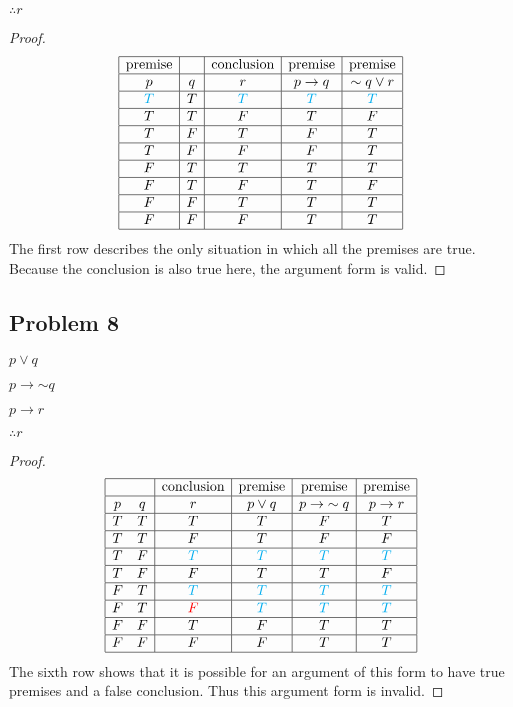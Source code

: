 \documentclass[14pt]{extarticle}
\begin{document}
$\therefore r$

\begin{proof}
$$
\begin{array}{|c|c|c|c|c|}
\hline
\text{premise} & & \text{conclusion} & \text{premise} & \text{premise} \\
\hline
p & q & r & p \to q & {\sim q} \vee r \\
\hline
\color{cyan} T & T & \color{cyan} T & \color{cyan} T & \color{cyan} T \\
\hline
T & T & F & T & F \\
\hline
T & F & T & F & T \\
\hline
T & F & F & F & T \\
\hline
F & T & T & T & T \\
\hline
F & T & F & T & F \\
\hline
F & F & T & T & T \\
\hline
F & F & F & T & T \\
\hline
\end{array}
$$
The first row describes the only situation in which all the premises are true.
Because the conclusion is also true here, the argument form is valid.
\end{proof}

\subsection{Problem 8}
$p \vee q$

$p \to {\sim q}$

$p \to r$

$\therefore r$

\begin{proof}
$$
\begin{array}{|cc|c|c|c|c|}
\hline
 & & \text{conclusion} & \text{premise} & \text{premise} & \text{premise} \\
\hline
p & q & r & p \vee q & p \to {\sim q} & p \to r \\
\hline
T & T & T & T & F & T \\
\hline
T & T & F & T & F & F \\
\hline
T & F & \color{cyan} T & \color{cyan} T & \color{cyan} T & \color{cyan} T \\
\hline
T & F & F & T & T & F \\
\hline
F & T & \color{cyan} T & \color{cyan} T & \color{cyan} T & \color{cyan} T \\
\hline
F & T & \color{red} F & \color{cyan} T & \color{cyan} T & \color{cyan} T \\
\hline
F & F & T & F & T & T \\
\hline
F & F & F & F & T & T \\
\hline
\end{array}
$$
The sixth row shows that it is possible for an argument of this form to have
true premises and a false conclusion. Thus this argument form is invalid.
\end{proof}
\end{document}
